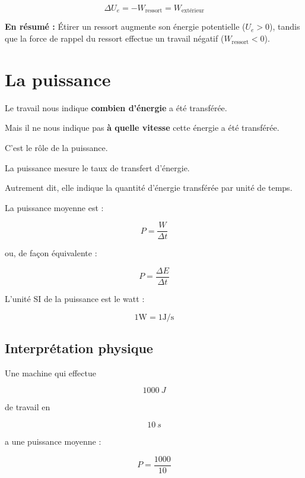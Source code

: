 \documentclass[11pt,openany]{book}
\begin{document}
\[
\boxed{\Delta U_e = - W_{\text{ressort}} = W_{\text{extérieur}}}
\]

\noindent\textbf{En résumé :} Étirer un ressort augmente son énergie potentielle ($U_e > 0$), tandis que la force de rappel du ressort effectue un travail négatif ($W_{\text{ressort}} < 0$).


\section{La puissance}

Le travail nous indique \textbf{combien d'énergie} a été transférée.

Mais il ne nous indique pas \textbf{à quelle vitesse} cette énergie
a été transférée.

C'est le rôle de la puissance.

\begin{definition}

La puissance mesure le taux de transfert d'énergie.

Autrement dit, elle indique la quantité d'énergie transférée par unité
de temps.

\end{definition}

La puissance moyenne est :

\[
\boxed{
P=\frac{W}{\Delta t}
}
\]

ou, de façon équivalente :

\[
\boxed{
P=\frac{\Delta E}{\Delta t}
}
\]

L'unité SI de la puissance est le watt :

\[
\boxed{
1\mathrm W=1\mathrm{J/s}
}
\]

\subsection{Interprétation physique}

Une machine qui effectue

\[
\SI{1000}{J}
\]

de travail en

\[
\SI{10}{s}
\]

a une puissance moyenne :

\[
P=\frac{1000}{10}
\]
\end{document}
